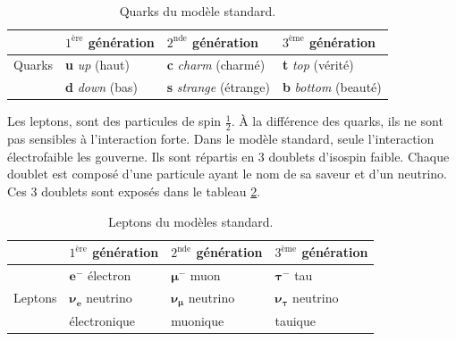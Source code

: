 \begin{table}[h]
\begin{center}
\begin{tabular}[t]{|l|l|l|l|} \hline
        & $1^{\text{\`ere}}$ g\'en\'eration & $2^{\text{nde}}$ g\'en\'eration         & $3^{\text{\`eme}}$ g\'en\'eration     \\ \hline
 Quarks & \textbf{u} \textit{up} (haut)     & \textbf{c} \textit{charm} (charm\'e)    & \textbf{t} \textit{top} (v\'erit\'e)  \\
        & \textbf{d} \textit{down} (bas)    & \textbf{s} \textit{strange} (\'etrange) & \textbf{b} \textit{bottom} (beaut\'e) \\ \hline
\end{tabular}
\caption{Quarks du mod\`ele standard.}
\label{tab:quarks}
\end{center}
\end{table}

\medskip

Les leptons, sont des particules de spin $\frac{1}{2}$. \`A la diff\'erence des 
quarks, ils ne sont pas sensibles \`a l'interaction forte. Dans le mod\`ele standard, seule 
l'interaction électrofaible les gouverne. Ils sont r\'epartis en 3 doublets d'isospin faible. Chaque doublet est compos\'e d'une particule ayant le nom de sa saveur et d'un neutrino. Ces 3 doublets sont 
expos\'es dans le tableau \ref{tab:leptons}.

\begin{table}[h]
\begin{center}
\begin{tabular}[t]{|l|l|l|l|} \hline
         & $1^{\text{\`ere}}$ g\'en\'eration & $2^{\text{nde}}$ g\'en\'eration & $3^{\text{\`eme}}$ g\'en\'eration \\ \hline
         & $\mathbf{e^-}$ électron           & $\mathbf{\mu^-}$ muon           & $\mathbf{\tau^-}$ tau             \\
 Leptons & $\mathbf{\nu_e}$ neutrino         & $\mathbf{\nu_{\mu}}$ neutrino   & $\mathbf{\nu_{\tau}}$ neutrino    \\
         & \'electronique                    & muonique                        & tauique                           \\ \hline
\end{tabular}
\caption{Leptons du mod\`eles standard.}
\label{tab:leptons}
\end{center}
\end{table}

\medskip

